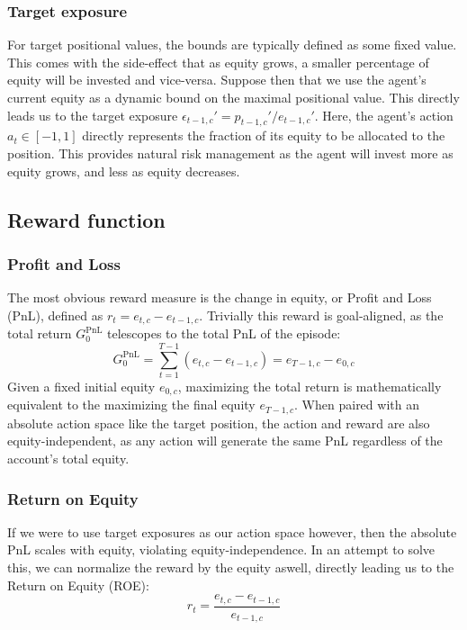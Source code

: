 \subsubsection{Target exposure}

For target positional values, the bounds are typically defined as some fixed value. This comes with the side-effect that as equity grows, a smaller percentage of equity will be invested and vice-versa. Suppose then that we use the agent's current equity as a dynamic bound on the maximal positional value. This directly leads us to the target exposure $\epsilon_{t-1,c}'=p_{t-1,c}' / e_{t-1,c}'$. Here, the agent's action $a_t \in [-1, 1]$ directly represents the fraction of its equity to be allocated to the position. This provides natural risk management as the agent will invest more as equity grows, and less as equity decreases.

\subsection{Reward function}

\subsubsection{Profit and Loss}

The most obvious reward measure is the change in equity, or Profit and Loss (PnL), defined as $r_t=e_{t,c}-e_{t-1,c}$. Trivially this reward is goal-aligned, as the total return $G^\text{PnL}_0$ telescopes to the total PnL of the episode:
$$
G^\text{PnL}_0=\sum^{T-1}_{t=1}(e_{t,c}-e_{t-1,c}) = e_{T-1,c}-e_{0,c}
$$
Given a fixed initial equity $e_{0,c}$, maximizing the total return is mathematically equivalent to the maximizing the final equity $e_{T-1,c}$. When paired with an absolute action space like the target position, the action and reward are also equity-independent, as any action will generate the same PnL regardless of the account's total equity. 

\subsubsection{Return on Equity}

If we were to use target exposures as our action space however, then the absolute PnL scales with equity, violating equity-independence. In an attempt to solve this, we can normalize the reward by the equity aswell, directly leading us to the Return on Equity (ROE):
$$
r_t = \frac{e_{t,c} - e_{t-1,c}}{e_{t-1,c}} 
$$

